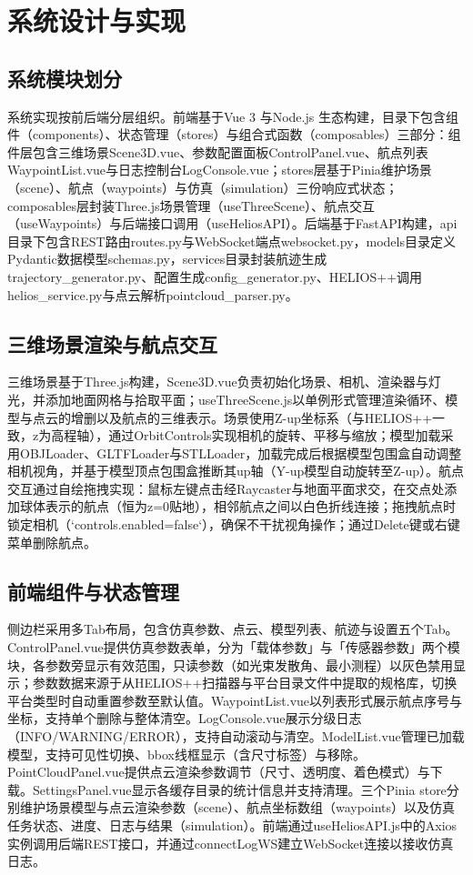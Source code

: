 \documentclass[a4paper,fleqn]{cas-sc}
\begin{document}
\section{系统设计与实现}\label{sec:impl}

\subsection{系统模块划分}
系统实现按前后端分层组织。前端基于Vue 3 \citep{vuejs} 与Node.js \citep{nodejs} 生态构建，目录下包含组件（components）、状态管理（stores）与组合式函数（composables）三部分：组件层包含三维场景Scene3D.vue、参数配置面板ControlPanel.vue、航点列表WaypointList.vue与日志控制台LogConsole.vue；stores层基于Pinia维护场景（scene）、航点（waypoints）与仿真（simulation）三份响应式状态；composables层封装Three.js场景管理（useThreeScene）、航点交互（useWaypoints）与后端接口调用（useHeliosAPI）。后端基于FastAPI构建，api目录下包含REST路由routes.py与WebSocket端点websocket.py，models目录定义Pydantic数据模型schemas.py，services目录封装航迹生成trajectory\_generator.py、配置生成config\_generator.py、HELIOS++调用helios\_service.py与点云解析pointcloud\_parser.py。

\subsection{三维场景渲染与航点交互}
三维场景基于Three.js构建，Scene3D.vue负责初始化场景、相机、渲染器与灯光，并添加地面网格与拾取平面；useThreeScene.js以单例形式管理渲染循环、模型与点云的增删以及航点的三维表示。场景使用Z-up坐标系（与HELIOS++一致，z为高程轴），通过OrbitControls实现相机的旋转、平移与缩放；模型加载采用OBJLoader、GLTFLoader与STLLoader，加载完成后根据模型包围盒自动调整相机视角，并基于模型顶点包围盒推断其up轴（Y-up模型自动旋转至Z-up）。航点交互通过自绘拖拽实现：鼠标左键点击经Raycaster与地面平面求交，在交点处添加球体表示的航点（恒为z=0贴地），相邻航点之间以白色折线连接；拖拽航点时锁定相机（`controls.enabled=false`），确保不干扰视角操作；通过Delete键或右键菜单删除航点。

\subsection{前端组件与状态管理}
侧边栏采用多Tab布局，包含仿真参数、点云、模型列表、航迹与设置五个Tab。ControlPanel.vue提供仿真参数表单，分为「载体参数」与「传感器参数」两个模块，各参数旁显示有效范围，只读参数（如光束发散角、最小测程）以灰色禁用显示；参数数据来源于从HELIOS++扫描器与平台目录文件中提取的规格库，切换平台类型时自动重置参数至默认值。WaypointList.vue以列表形式展示航点序号与坐标，支持单个删除与整体清空。LogConsole.vue展示分级日志（INFO/WARNING/ERROR），支持自动滚动与清空。ModelList.vue管理已加载模型，支持可见性切换、bbox线框显示（含尺寸标签）与移除。PointCloudPanel.vue提供点云渲染参数调节（尺寸、透明度、着色模式）与下载。SettingsPanel.vue显示各缓存目录的统计信息并支持清理。三个Pinia store分别维护场景模型与点云渲染参数（scene）、航点坐标数组（waypoints）以及仿真任务状态、进度、日志与结果（simulation）。前端通过useHeliosAPI.js中的Axios实例调用后端REST接口，并通过connectLogWS建立WebSocket连接以接收仿真日志。
\end{document}
